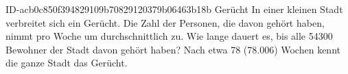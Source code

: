\begin{exercise}
      {ID-acb0c850f394829109b70829120379b06463b18b}
      {Gerücht}
  \ifproblem\problem
    In einer kleinen Stadt verbreitet sich ein Gerücht. Die Zahl der Personen,
    die davon gehört haben, nimmt pro Woche um durchschnittlich  zu.
    Wie lange dauert es, bis alle \num{54300} Bewohner der Stadt davon gehört
    haben?
  \fi
  \ifoutcome\outcome
    Nach etwa 78 (\num{78.006}) Wochen kennt die ganze Stadt das Gerücht.
  \fi
\end{exercise}
